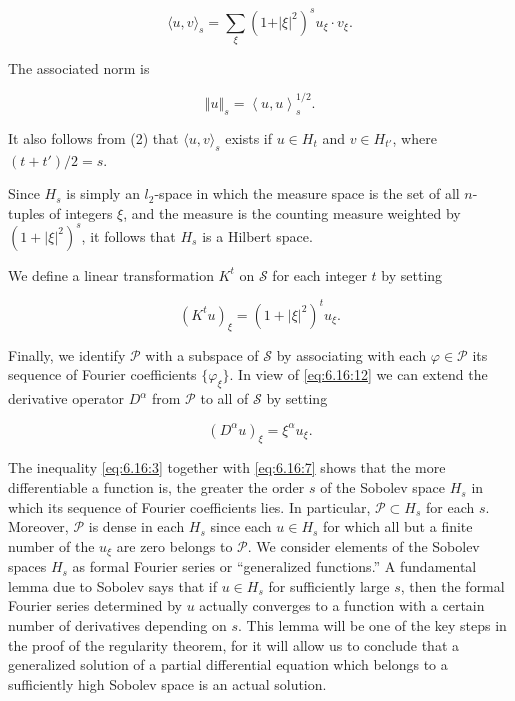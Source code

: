 \begin{equation}
\tag{3}\label{eq:6.17:3}
\langle u,v\rangle_{s}=\sum_{\xi}(1+\vert\xi\vert^{2})^{s}u_{\xi}\cdot v_{\xi}.
\end{equation}

The associated norm is

\begin{equation}
\tag{4}\label{eq:6.17:4}
\left\Vert{u}\right\Vert_{s}=\left\langle{u,u}\right\rangle_{s}^{1/2}.
\end{equation}

It also follows from (2) that  $ \langle u, v \rangle_s $ exists if  $ u \in H_t $ and  $ v \in H_{t'} $, where  $ (t + t')/2 = s $.

Since $H_{s}$ is simply an $l_{2}$-space in which the measure space is the set of all $n$-tuples of integers $\xi$, and the measure is the counting measure weighted by $(1 + |\xi|^{2})^{s}$, it follows that $H_{s}$ is a Hilbert space.

We define a linear transformation  $ K^{t} $ on $\mathcal{S}$ for each integer $t$ by setting

\begin{equation}
\tag{5}\label{eq:6.17:5}
(K^{t}u)_{\xi}=(1+|\xi|^{2})^{t}u_{\xi}.
\end{equation}

Finally, we identify $\mathcal{P}$ with a subspace of $\mathcal{S}$ by associating with each $\varphi \in \mathcal{P}$ its sequence of Fourier coefficients $\{\varphi_{\xi}\}$. In view of \eqref{eq:6.16:12} we can extend the derivative operator $D^{\alpha}$ from $\mathcal{P}$ to all of $\mathcal{S}$ by setting

\begin{equation}
\tag{6}\label{eq:6.17:6}
(D^{\alpha}u)_{\xi}=\xi^{\alpha}u_{\xi}.
\end{equation}

The inequality \eqref{eq:6.16:3} together with \eqref{eq:6.16:7} shows that the more differentiable a function is, the greater the order $s$ of the Sobolev space $H_s$ in which its sequence of Fourier coefficients lies. In particular, $\mathcal{P} \subset H_s$ for each $s$. Moreover, $\mathcal{P}$ is dense in each $H_s$ since each $u \in H_s$ for which all but a finite number of the $u_\xi$ are zero belongs to $\mathcal{P}$. We consider elements of the Sobolev spaces $H_s$ as formal Fourier series or “generalized functions.” A fundamental lemma due to Sobolev says that if $u \in H_s$ for sufficiently large $s$, then the formal Fourier series determined by $u$ actually converges to a function with a certain number of derivatives depending on $s$. This lemma will be one of the key steps in the proof of the regularity theorem, for it will allow us to conclude that a generalized solution of a partial differential equation which belongs to a sufficiently high Sobolev space is an actual solution.

